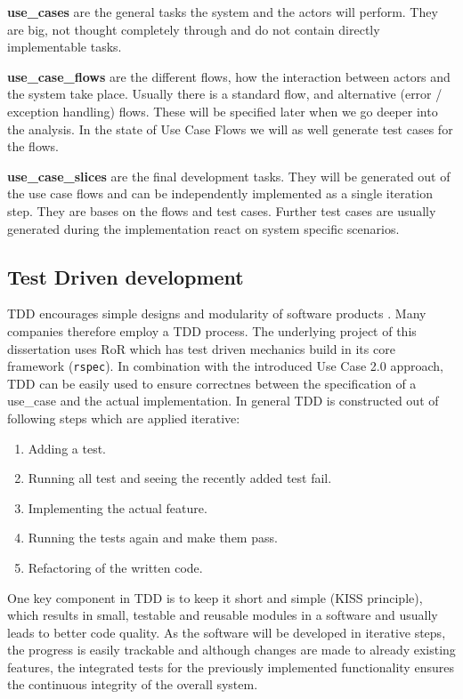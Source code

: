\textbf{\Glspl{use_case}} are the general tasks the system and the actors will perform. They are big, not thought completely through and do not contain directly implementable tasks.

\textbf{\Glspl{use_case_flow}} are the different flows, how the interaction between actors and the system take place. Usually there is a standard flow, and alternative (error / exception handling) flows. These will be specified later when we go deeper into the analysis. In the state of Use Case Flows we will as well generate test cases for the flows. 

\textbf{\Glspl{use_case_slice}} are the final development tasks. They will be generated out of the use case flows and can be independently implemented as a single iteration step. They are bases on the flows and test cases. Further test cases are usually generated during the implementation react on system specific scenarios.


\subsection{Test Driven development}
\label{sec:tdd}
\Gls{TDD} encourages simple designs and modularity of software products \cite{tdd}. Many companies therefore employ a \gls{TDD} process. The underlying project of this dissertation uses \gls{RoR} which has test driven mechanics build in its core framework (\texttt{rspec}). In combination with the introduced Use Case 2.0 approach, \gls{TDD} can be easily used to ensure correctnes between the specification of a \gls{use_case} and the actual implementation. In general \gls{TDD} is constructed out of following steps which are applied iterative: 

\begin{enumerate}
	\item Adding a test.
	\item Running all test and seeing the recently added test fail.
	\item Implementing the actual feature.
	\item Running the tests again and make them pass.
	\item Refactoring of the written code.
\end{enumerate}


One key component in \gls{TDD} is to keep it short and simple (KISS principle), which results in small, testable and reusable modules in a software and usually leads to better code quality. As the software will be developed in iterative steps, the progress is easily trackable and although changes are made to already existing features, the integrated tests for the previously implemented functionality ensures the continuous integrity of the overall system.  


